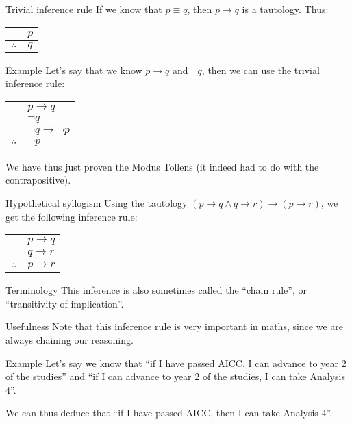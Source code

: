 \documentclass{article}
\begin{document}
\begin{parag}{Trivial inference rule}
    If we know that $p \equiv q$, then $p \to q$ is a tautology. Thus:
    \begin{center}
    \begin{tabular}{rl}
        & $p$ \\
        \hline
        $\therefore$ & $q$
    \end{tabular}
    \end{center}

    \begin{subparag}{Example}
        Let's say that we know $p \to q$ and $\lnot q$, then we can use the trivial inference rule:
        \begin{center}
        \begin{tabular}{rl}
            & $p \to q$ \\
            & $\lnot q$ \\
            & $\lnot q \to \lnot p$ \\
            \hline
            $\therefore$ & $\lnot p$
        \end{tabular}
        \end{center}

        We have thus just proven the Modus Tollens (it indeed had to do with the contrapositive).
    \end{subparag}
\end{parag}

\begin{parag}{Hypothetical syllogism}
    Using the tautology $\left(p \to q \land q \to r\right) \to \left(p \to r\right)$, we get the following inference rule:
    \begin{center}
    \begin{tabular}{rl}
        & $p \to q$ \\
        & $q \to r$ \\
        \hline
        $\therefore$ & $p \to r$
    \end{tabular}
    \end{center}

    \begin{subparag}{Terminology}
        This inference is also sometimes called the ``chain rule'', or ``transitivity of implication''.
    \end{subparag}

    \begin{subparag}{Usefulness}
        Note that this inference rule is very important in maths, since we are always chaining our reasoning.
    \end{subparag}

    \begin{subparag}{Example}
        Let's say we know that ``if I have passed AICC, I can advance to year 2 of the studies'' and ``if I can advance to year 2 of the studies, I can take Analysis 4''.

        We can thus deduce that ``if I have passed AICC, then I can take Analysis 4''.
    \end{subparag}
\end{parag}
\end{document}
